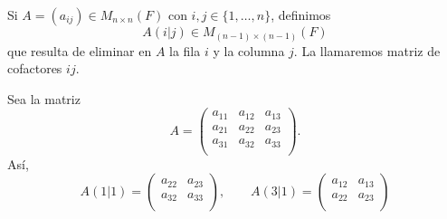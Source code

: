 \documentclass[12pt,a4paper]{book}
\newcommand{\llaves}[1]{\{#1\}}
\begin{document}
    \begin{definicion}
    \label{def:36}
        Si $A = (a_{ij}) \in M_{n \times n}(F)$ con $i,j \in \llaves{1, \dots, n}$, definimos
        \begin{equation*}
        A(i | j) \in M_{(n - 1) \times (n - 1)}(F)
        \end{equation*}
        que resulta de eliminar en $A$ la fila $i$ y la columna $j$. La llamaremos matriz de cofactores $ij$.
    \end{definicion}
    \begin{ejemplo}
    \label{ej:43}
        Sea la matriz
        \begin{equation*}
        A = \begin{pmatrix}
            a_{11} & a_{12} & a_{13}\\
            a_{21} & a_{22} & a_{23}\\
            a_{31} & a_{32} & a_{33}\\
        \end{pmatrix}.
        \end{equation*}
        Así,
        \begin{equation*}
        A(1 | 1) = \begin{pmatrix}
            a_{22} & a_{23}\\
            a_{32} & a_{33}\\
        \end{pmatrix}, \qquad A(3 | 1) = \begin{pmatrix}
            a_{12} & a_{13}\\
            a_{22} & a_{23}\\
        \end{pmatrix}        
        \end{equation*}
    \end{ejemplo}
\end{document}
